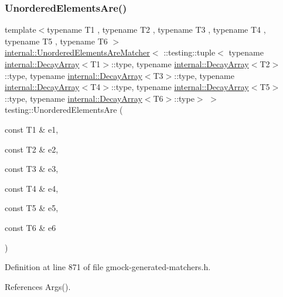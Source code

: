 \subsubsection{\texorpdfstring{Unordered\+Elements\+Are()}{UnorderedElementsAre()}\hspace{0.1cm}{\footnotesize\ttfamily [7/11]}}
{\footnotesize\ttfamily template$<$typename T1 , typename T2 , typename T3 , typename T4 , typename T5 , typename T6 $>$ \\
\hyperlink{classtesting_1_1internal_1_1UnorderedElementsAreMatcher}{internal\+::\+Unordered\+Elements\+Are\+Matcher}$<$ \+::testing\+::tuple$<$ typename \hyperlink{structtesting_1_1internal_1_1DecayArray}{internal\+::\+Decay\+Array}$<$T1$>$\+::type, typename \hyperlink{structtesting_1_1internal_1_1DecayArray}{internal\+::\+Decay\+Array}$<$T2$>$\+::type, typename \hyperlink{structtesting_1_1internal_1_1DecayArray}{internal\+::\+Decay\+Array}$<$T3$>$\+::type, typename \hyperlink{structtesting_1_1internal_1_1DecayArray}{internal\+::\+Decay\+Array}$<$T4$>$\+::type, typename \hyperlink{structtesting_1_1internal_1_1DecayArray}{internal\+::\+Decay\+Array}$<$T5$>$\+::type, typename \hyperlink{structtesting_1_1internal_1_1DecayArray}{internal\+::\+Decay\+Array}$<$T6$>$\+::type$>$ $>$ testing\+::\+Unordered\+Elements\+Are (\begin{DoxyParamCaption}\item[{const T1 \&}]{e1,  }\item[{const T2 \&}]{e2,  }\item[{const T3 \&}]{e3,  }\item[{const T4 \&}]{e4,  }\item[{const T5 \&}]{e5,  }\item[{const T6 \&}]{e6 }\end{DoxyParamCaption})\hspace{0.3cm}{\ttfamily [inline]}}



Definition at line 871 of file gmock-\/generated-\/matchers.\+h.



References Args().


